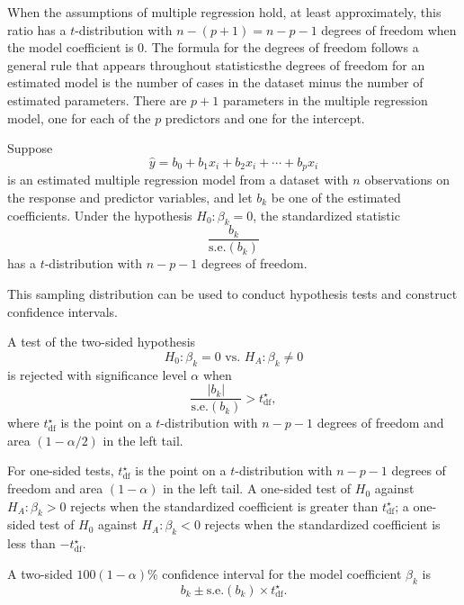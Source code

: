 When the assumptions of multiple regression hold, at least approximately, this ratio has a $t$-distribution with $n - (p + 1) =n - p - 1$ degrees of freedom when the model coefficient is 0. The formula for the degrees of freedom follows a general rule that appears throughout statistics\textemdash the degrees of freedom for an estimated model is the number of cases in the dataset minus the number of estimated parameters.  There are $p + 1$ parameters in the multiple regression model, one for each of the $p$ predictors and one for the intercept.

\begin{termBox}{
Suppose 
\[
\hat{y} = b_0 + b_1 x_{i} + b_2 x_{i} +\cdots + b_p x_{i}
\]
is an estimated multiple regression model from a dataset with $n$ observations on the response and predictor variables, and let $b_k$ be one of the estimated coefficients.  Under the hypothesis $H_0: \beta_k = 0$, the standardized statistic
\[
      \frac{b_k}{\textrm{s.e.}(b_k)}
\]
has a $t$-distribution with $n - p - 1$ degrees of freedom.}
\end{termBox}

This sampling distribution can be used to conduct hypothesis tests and construct confidence intervals.

\begin{termBox}{
A test of the two-sided hypothesis
\[
  H_0: \beta_k = 0 \text{ vs. } H_A: \beta_k \ne 0
\]
is rejected with significance level $\alpha$ when 
\[
     \frac{|b_k|}{\textrm{s.e.}(b_k)} > t_{\text{df}}^\star,
\]
where $t_{\text{df}}^\star$ is the point on a $t$-distribution with $n - p - 1$ degrees of freedom and area $(1 - \alpha/2)$ in the left tail.}
\end{termBox}

For one-sided tests, $t_{\text{df}}^\star$ is the point on a $t$-distribution with $n - p - 1$ degrees of freedom and area $(1 - \alpha)$ in the left tail. A one-sided test of $H_0$ against $H_A: \beta_k > 0$ rejects when the standardized coefficient is greater than  $ t_{\text{df}}^\star$; a one-sided test of $H_0$ against $H_A: \beta_k < 0$  rejects when the standardized coefficient is less than $-t_{\text{df}}^\star$. 

\begin{termBox}{
A two-sided $100(1 - \alpha)$\% confidence interval for the model coefficient $\beta_k$ is 
\[
     b_k \pm {\textrm{s.e.}(b_k)} \times t_{\text{df}}^\star.
\]}
\end{termBox}


